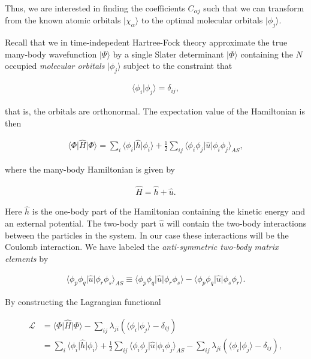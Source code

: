 \documentclass[%
oneside,                 %
final,                   %
10pt]{article}
\begin{document}
Thus, we are interested in finding the coefficients $C_{\alpha j}$ such that we
can transform from the known atomic orbitals $\vert\chi_{\alpha}\rangle$ to the
optimal molecular orbitals $\vert\phi_j\rangle$.


Recall that we in time-indepedent Hartree-Fock theory approximate the true
many-body wavefunction $\vert\Psi\rangle$ by a single Slater determinant
$\vert\Phi\rangle$ containing the $N$ occupied \emph{molecular orbitals}
$\vert\phi_j\rangle$ subject to the constraint that

\begin{align}
    \langle \phi_i \vert \phi_j \rangle = \delta_{ij},
\end{align}

that is, the orbitals are orthonormal. The expectation value of the Hamiltonian
is then

\begin{align}
    \langle \Phi \vert \hat{H} \vert \Phi \rangle
    = \sum_{i} \langle \phi_i \vert \hat{h} \vert \phi_i \rangle
    + \frac{1}{2} \sum_{ij}
    \langle \phi_i \phi_j \vert \hat{u} \vert \phi_i \phi_j \rangle_{AS},
\end{align}

where the many-body Hamiltonian is given by

\begin{align}
    \hat{H} = \hat{h} + \hat{u}.
\end{align}

Here $\hat{h}$ is the one-body part of the Hamiltonian containing the kinetic
energy and an external potential. The two-body part $\hat{u}$ will contain the
two-body interactions between the particles in the system. In our case these
interactions will be the Coulomb interaction. We have labeled the
\emph{anti-symmetric two-body matrix elements} by

\begin{align}
    \langle \phi_p \phi_q \vert \hat{u} \vert \phi_r \phi_s \rangle_{AS}
    \equiv
    \langle \phi_p \phi_q \vert \hat{u} \vert \phi_r \phi_s \rangle
    - \langle \phi_p \phi_q \vert \hat{u} \vert \phi_s \phi_r \rangle.
\end{align}

By constructing the Lagrangian functional

\begin{align}
    \mathcal{L}
    &= \langle \Phi \vert \hat{H} \vert \Phi \rangle
    - \sum_{ij} \lambda_{ji} \left(
        \langle \phi_i \vert \phi_j \rangle - \delta_{ij}
    \right)
    \\
    &=
    \sum_{i} \langle \phi_i \vert \hat{h} \vert \phi_i \rangle
    + \frac{1}{2} \sum_{ij}
    \langle \phi_i \phi_j \vert \hat{u} \vert \phi_i \phi_j \rangle_{AS}
    - \sum_{ij} \lambda_{ji} \left(
        \langle \phi_i \vert \phi_j \rangle - \delta_{ij}
    \right),
\end{align}
\end{document}
